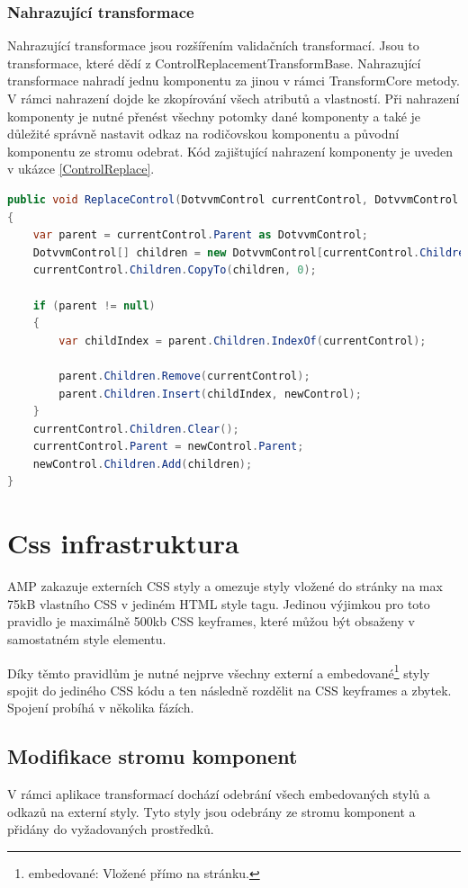 \subsubsection{Nahrazující transformace}
    Nahrazující transformace jsou rozšířením validačních transformací. Jsou to transformace, které dědí z ControlReplacementTransformBase. Nahrazující transformace nahradí jednu komponentu za jinou v rámci TransformCore metody. V rámci nahrazení dojde ke zkopírování všech atributů a vlastností. Při nahrazení komponenty je nutné přenést všechny potomky dané komponenty a také je důležité správně nastavit odkaz na rodičovskou komponentu a původní komponentu ze stromu odebrat. Kód zajištující nahrazení komponenty je uveden v ukázce \ref{ControlReplace}.
    
    \begin{lstlisting}[language=c#, caption= Nahrazení jedné DotVVM komponenty za jinou. ,label=ControlReplace,captionpos=t]
public void ReplaceControl(DotvvmControl currentControl, DotvvmControl newControl)
{
    var parent = currentControl.Parent as DotvvmControl;
    DotvvmControl[] children = new DotvvmControl[currentControl.Children.Count];
    currentControl.Children.CopyTo(children, 0);

    if (parent != null)
    {
        var childIndex = parent.Children.IndexOf(currentControl);

        parent.Children.Remove(currentControl);
        parent.Children.Insert(childIndex, newControl);
    }
    currentControl.Children.Clear();
    currentControl.Parent = newControl.Parent;
    newControl.Children.Add(children);
}

\end{lstlisting}

\section{Css infrastruktura}
AMP zakazuje externích CSS styly a omezuje styly vložené do stránky na max 75kB vlastního CSS v jediném HTML style tagu. Jedinou výjimkou pro toto pravidlo je maximálně 500kb CSS keyframes, které můžou být obsaženy v samostatném style elementu.

Díky těmto pravidlům je nutné nejprve všechny externí a embedované\footnote{embedované: Vložené přímo na stránku.} styly spojit do jediného CSS kódu a ten následně rozdělit na CSS keyframes a zbytek. Spojení probíhá v několika fázích.
\subsection*{Modifikace stromu komponent}
V rámci aplikace transformací dochází odebrání všech embedovaných stylů a odkazů na externí styly. Tyto styly jsou odebrány ze stromu komponent a přidány do vyžadovaných prostředků.

